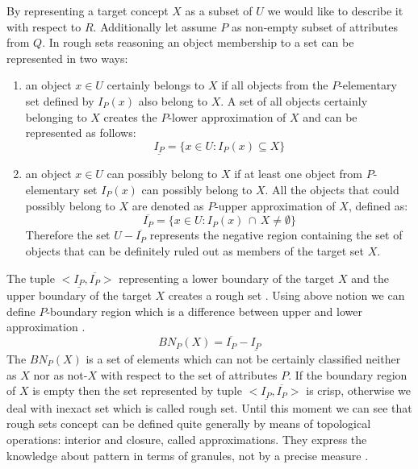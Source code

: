 By representing a target concept $X$ as a subset of $U$ we would like to
describe it with respect to $R$. Additionally let assume $P$ as non-empty
subset of attributes from $Q$. In rough sets reasoning an object membership to a
set can be represented in two ways:
\begin{enumerate}
    \item an object $ x \in U$ certainly belongs to $X$ if
        all objects from the $P$-elementary set defined by $I_P(x)$ also belong to $X$.
        A set of all objects certainly belonging to $X$ creates the $P$-lower
        approximation of $X$ and can be represented as follows:
        \begin{equation}
            \underline{I_P} = \{ x \in U: I_P(x) \subseteq X\}
            \label{eq:lower_approximation}
        \end{equation}
    \item an object $x \in U$ can possibly belong to $X$ if at least one object
        from $P$-elementary set $I_P(x)$ can possibly belong to $X$. All the
        objects that could possibly belong to $X$ are denoted as $P$-upper
        approximation of $X$, defined as:
        \begin{equation}
            \overline{I_P} = \{x\in U: I_P(x) \, \cap \, X \neq \emptyset \}
            \label{eq:upper_approximation}
        \end{equation}
        Therefore the set $U - \overline{I_P}$ represents the negative region
        containing the set of objects that can be definitely ruled out as
        members of the target set $X$.
\end{enumerate}

The tuple $<\underline{I_P}, \overline{I_P}>$ representing a lower boundary of
the target $X$ and the upper boundary of the target $X$ creates a rough set \cite{bib34}.
Using above notion we can define $P$-boundary region which is a difference
between upper and lower approximation \cite{bib14}. 
\begin{equation}
    BN_P(X) = \overline{I_P} - \underline{I_P}
    \label{eq:boundary_region}
\end{equation}
The $BN_P(X)$ is a set of elements which can not be certainly classified neither
as $X$ nor as not-$X$ with respect to the set of attributes $P$. If the
boundary region of $X$ is empty then the set represented by tuple
$<\underline{I_P}, \overline{I_P}>$ 
is crisp, otherwise we deal with inexact set which is called rough set. 
Until this moment we can see that rough sets concept can be defined quite generally by means of topological
operations: interior and closure, called approximations. They express the
knowledge about pattern in terms of granules, not by a precise measure
\cite{bib40}.

